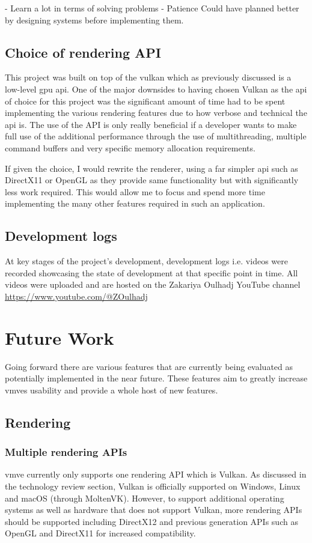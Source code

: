 \documentclass[11pt]{article}
\begin{document}
- Learn a lot in terms of solving problems
- Patience
Could have planned better by designing systems before implementing them.


\subsection{Choice of rendering API}
This project was built on top of the \gls*{vulkan} which as previously discussed is a
low-level \gls*{gpu} \gls*{api}. One of the major downsides to having chosen Vulkan as
the \gls*{api} of choice for this project was the significant amount of time had
to be spent implementing the various rendering features due to how verbose and
technical the \gls*{api} is. The use of the API is only really beneficial if a
developer wants to make full use of the additional performance through the use
of multithreading, multiple command buffers and very specific memory allocation
requirements.

If given the choice, I would rewrite the renderer, using a far simpler \gls*{api}
such as DirectX11 or OpenGL as they provide same functionality but with
significantly less work required. This would allow me to focus and spend more time 
implementing the many other features required in such an application.

\subsection{Development logs}
At key stages of the project's development, development logs i.e. videos were
recorded showcasing the state of development at that specific point in time. All
videos were uploaded and are hosted on the Zakariya Oulhadj YouTube channel
\url{https://www.youtube.com/@ZOulhadj}

\clearpage
\section{Future Work}
Going forward there are various features that are currently being evaluated as
potentially implemented in the near future. These features aim to greatly
increase \glspl*{vmve} usability and provide a whole host of new features.

\subsection{Rendering}

\subsubsection{Multiple rendering APIs}
\gls*{vmve} currently only supports one rendering API which is Vulkan. As
discussed in the technology review section, Vulkan is officially supported on
Windows, Linux and macOS (through MoltenVK). However, to support additional
operating systems as well as hardware that does not support Vulkan, more
rendering APIs should be supported including DirectX12 and previous generation
APIs such as OpenGL and DirectX11 for increased compatibility.
\end{document}

